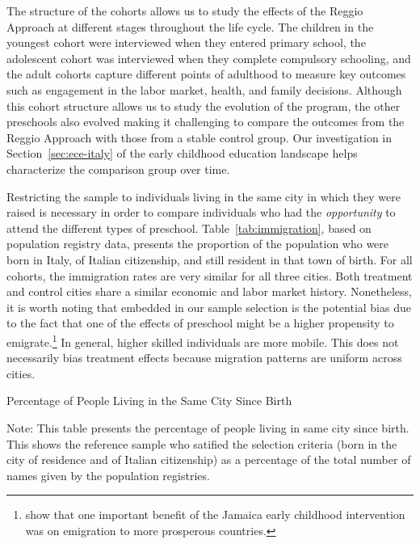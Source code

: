 The structure of the cohorts allows us to study the effects of the Reggio Approach at different stages throughout the life cycle. The children in the youngest cohort were interviewed when they entered primary school, the adolescent cohort was interviewed when they complete compulsory schooling, and the adult cohorts capture different points of adulthood to measure key outcomes such as engagement in the labor market, health, and family decisions. Although this cohort structure allows us to study the evolution of the program, the other preschools also evolved making it challenging to compare the outcomes from the Reggio Approach with those from a stable control group. Our investigation in Section~\ref{sec:ece-italy} of the early childhood education landscape helps characterize the comparison group over time.

Restricting the sample to individuals living in the same city in which they were raised is necessary in order to compare individuals who had the \textit{opportunity} to attend the different types of preschool. Table~\ref{tab:immigration}, based on population registry data, presents the proportion of the population who were born in Italy, of Italian citizenship, and still resident in that town of birth. For all cohorts, the immigration rates are very similar for all three cities. Both treatment and control cities share a similar economic and labor market history. Nonetheless, it is worth noting that embedded in our sample selection is the potential bias due to the fact that one of the effects of preschool might be a higher propensity to emigrate.\footnote{\citet{Gertler_Heckman_etal_2014_Science} show that one important benefit of the Jamaica early childhood intervention was on emigration to more prosperous countries.} In general, higher skilled individuals are more mobile. This does not necessarily bias treatment effects because migration patterns are uniform across cities.

\begin{table}[H]
\centering
\begin{threeparttable}
	\caption{Percentage of People Living in the Same City Since Birth}\label{tab:immigration}
	
\begin{tablenotes}
\footnotesize
Note: This table presents the percentage of people living in same city since birth. This  shows the reference sample who satified the selection criteria (born in the city of residence and of Italian citizenship) as a percentage of the total number of names given by the population registries.
\end{tablenotes}
\end{threeparttable}
\end{table}

